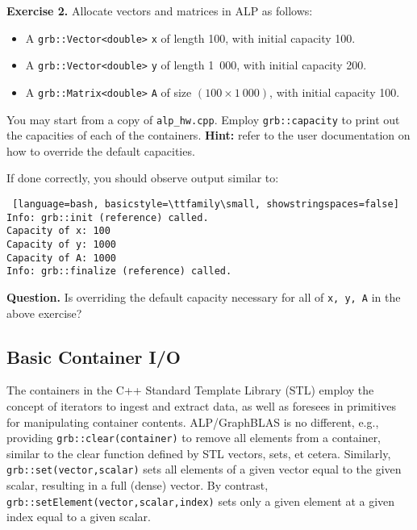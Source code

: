 \noindent \textbf{Exercise 2.} Allocate vectors and matrices in ALP as follows:
\begin{itemize}
  \item A \texttt{grb::Vector<double>} \texttt{x} of length 100, with initial capacity 100.
  \item A \texttt{grb::Vector<double>} \texttt{y} of length 1\ 000, with initial capacity 200.
  \item A \texttt{grb::Matrix<double>} \texttt{A} of size $(100 \times 1\ 000)$, with initial capacity 100.
\end{itemize}
You may start from a copy of \texttt{alp\_hw.cpp}. Employ \texttt{grb::capacity} to print out the capacities of each of the containers. \textbf{Hint:} refer to the user documentation on how to override the default capacities.

If done correctly, you should observe output similar to:

\begin{lstlisting} [language=bash, basicstyle=\ttfamily\small, showstringspaces=false]
Info: grb::init (reference) called.
Capacity of x: 100
Capacity of y: 1000
Capacity of A: 1000
Info: grb::finalize (reference) called.
\end{lstlisting}

\noindent \textbf{Question.} Is overriding the default capacity necessary for all of \texttt{x, y, A} in the above exercise?

\subsection{Basic Container I/O}

The containers in the C++ Standard Template Library (STL) employ the concept of iterators to ingest and extract data, as well as foresees in primitives for manipulating container contents.
ALP/GraphBLAS is no different, e.g., providing \texttt{grb::clear(container)} to remove all elements from a container, similar to the clear function defined by STL vectors, sets, et cetera.
Similarly, \texttt{grb::set(vector,scalar)} sets all elements of a given vector equal to the given scalar, resulting in a full (dense) vector.
By contrast, \texttt{grb::setElement(vector,scalar,index)} sets only a given element at a given index equal to a given scalar.

